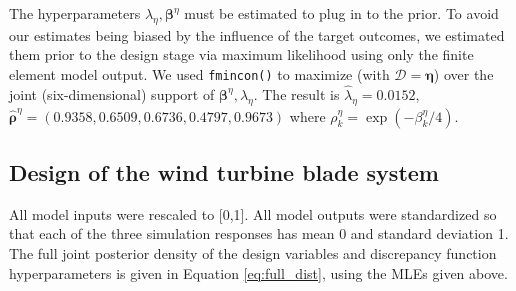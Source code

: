 \documentclass[12pt]{article}
\begin{document}
The hyperparameters $\lambda_\eta,\boldsymbol \beta^\eta$ must be estimated to plug in to the prior.
% 
To avoid our estimates being biased by the influence of the target outcomes, we estimated them prior to the design stage via maximum likelihood using only the finite element model output.
% 
%
We used \texttt{fmincon()} \citep{MATLAB2017} %
to maximize (with $\mathcal D=\boldsymbol\eta$) over the joint (six-dimensional) support of $\boldsymbol \beta^\eta,\lambda_\eta$.  
%
The result is $\hat\lambda_\eta = 0.0152$, $\boldsymbol {\hat\rho}^\eta = (0.9358, 0.6509, 0.6736, 0.4797, 0.9673)$
where $\rho^\eta_k = \exp(-\beta_k^\eta/4)$. 

\subsection{Design of the wind turbine blade system}\label{the_model}
%
All model inputs were rescaled to [0,1]. 
%
All model outputs were standardized so that each of the three simulation responses has mean 0 and standard deviation 1.
%
The full joint posterior density of the design variables and discrepancy function hyperparameters is given in Equation \eqref{eq:full_dist}, using the MLEs given above.
%
\end{document}
